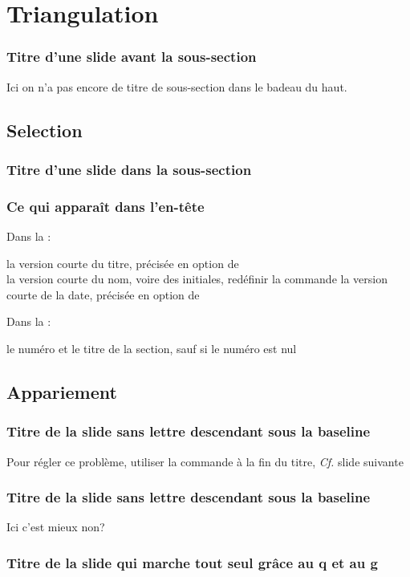 \section[Triangulation]{Triangulation}
\begin{frame}
\frametitle{Titre d'une slide avant la sous-section\esp}
	Ici on n'a pas encore de titre de sous-section dans le badeau du haut.
\end{frame}


\subsection{Selection}
\begin{frame}
\frametitle{Titre d'une slide dans la sous-section\esp}
\end{frame}


\begin{frame}
\frametitle{Ce qui apparaît dans l'en-tête}
	Dans la :
	\begin{itemize}
	\flch la version courte du titre, précisée en option  de  \lin{\title}\\
	\flch la version courte du nom, voire des initiales, redéfinir la commande
	\lin{\initiales}
	\flch la version courte de la date, précisée en option de \lin{\date}\\
	\end{itemize}
	\bigskip
	Dans la \important{deuxième ligne}:
	\begin{itemize}
	\flch le numéro et le titre de la section, sauf si le numéro est nul\\
\end{itemize}

\end{frame}


\subsection{Appariement}
\begin{frame}
\frametitle{Titre de la slide sans lettre descendant sous la baseline}
	Pour régler ce problème, utiliser la commande \lin{\esp} à la fin du titre, \textit{Cf.} slide suivante
\end{frame}


\begin{frame}
\frametitle{Titre de la slide sans lettre descendant sous la baseline\esp}
	Ici c'est mieux non?
\end{frame}


\begin{frame}[fragile]
\frametitle{Titre de la slide qui marche tout seul grâce au q et au g}
\end{frame}
